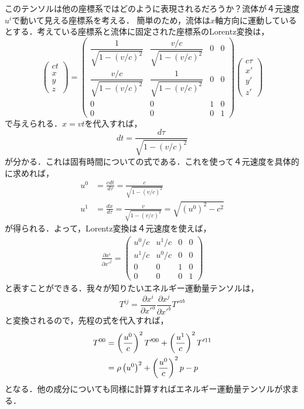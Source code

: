 \documentclass[a4paper]{ltjsreport}
\begin{document}
このテンソルは他の座標系ではどのように表現されるだろうか？流体が４元速度$u^i$で動いて見える座標系を考える．
簡単のため，流体は$x$軸方向に運動しているとする．考えている座標系と流体に固定された座標系のLorentz変換は，
\[
\begin{pmatrix}
  ct\\
  x\\
  y\\
  z
\end{pmatrix}
=
\begin{pmatrix}
  \dfrac{1}{\sqrt{1 - (v/c)^2}} & \dfrac{v/c}{\sqrt{1 - (v/c)^2}} & 0 & 0\\
  \dfrac{v/c}{\sqrt{1 - (v/c)^2}} & \dfrac{1}{\sqrt{1 - (v/c)^2}} & 0 & 0\\
  0 & 0 & 1 & 0\\
  0 & 0 & 0 & 1
\end{pmatrix}
\begin{pmatrix}
  c\tau\\
  x'\\
  y'\\
  z'
\end{pmatrix}
\]
で与えられる．$x=vt$を代入すれば，
\[dt=\frac{d\tau}{\sqrt{1 - (v/c)^2}}\]
が分かる．これは固有時間についての式である．これを使って４元速度を具体的に求めれば，
\begin{align}
  u^0 &= \frac{cdt}{d\tau} = \frac{c}{\sqrt{1 - (v/c)^2}}\\
  u^1 &= \frac{dx}{d\tau} = \frac{v}{\sqrt{1 - (v/c)^2}} = \sqrt{\left(u^0\right)^2 - c^2}
\end{align}
が得られる．よって，Lorentz変換は４元速度を使えば，
\begin{align}
  \frac{\partial{x^i}}{\partial{x'^j}}=
  \begin{pmatrix}
    {u^0}/{c} & {u^1}/{c} & 0 & 0\\
    {u^1}/{c} & {u^0}/{c} & 0 & 0\\
    0 & 0 & 1 & 0\\
    0 & 0 & 0 & 1
  \end{pmatrix}
\end{align}
と表すことができる．我々が知りたいエネルギー運動量テンソルは，
\[T^{ij}=\frac{\partial{x^i}}{\partial{x'^a}}\frac{\partial{x^j}}{\partial{x'^b}}T'^{ab}\]
と変換されるので，先程の式を代入すれば，
\begin{align}
  T^{00} &= \left(\frac{u^0}{c}\right)^2 T'^{00} + \left(\frac{u^1}{c}\right)^2 T'^{11}\notag\\
  &= \rho\left(u^0\right)^2 + \left(\frac{u^0}{c}\right)^2p - p
\end{align}
となる．他の成分についても同様に計算すればエネルギー運動量テンソルが求まる．
\end{document}
